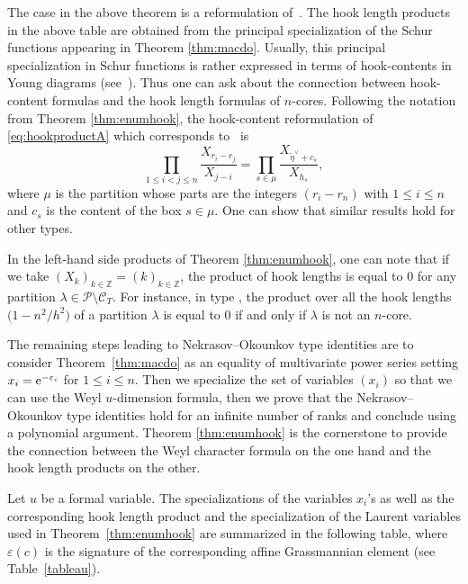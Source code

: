 \documentclass[pdftex]{sigma}
\numberwithin{equation}{section}
\newcommand{\cC}{\mathcal{C}}
\def\ccp{\mathcal P}
\newcommand{\Z}{\mathbb{Z}}
\begin{document}
\begin{Remark}
The case  in the above theorem is a reformulation of~\cite[Theorem 1]{HD}. The hook length products in the above table are obtained from the principal specialization of the Schur functions appearing in Theorem \ref{thm:macdo}. Usually, this principal specialization in Schur functions is rather expressed in terms of hook-contents in Young diagrams (see~\cite[Theorem $15.3$]{Stanleyhook}). Thus one can ask about the connection between hook-content formulas and the hook length formulas of $n$-cores. Following the notation from Theorem \ref{thm:enumhook}, the hook-content reformulation of \eqref{eq:hookproductA} which corresponds to~\cite[Theorem $17$]{HD} is
\[
\prod_{1\leq i<j\leq n} \frac{X_{r_i-r_j}}{X_{j-i}}=\prod_{s\in\mu} \frac{X_{\tilde{\eta}^{\vee}+c_s}}{X_{h_s}},
\]
where $\mu$ is the partition whose parts are the integers $(r_i-r_n)$ with $1\leq i\leq n$ and $c_s$ is the content of the box $s\in\mu$.
One can show that similar results hold for other types.
\end{Remark}

\begin{Remark}
In the left-hand side products of Theorem \ref{thm:enumhook}, one can note that if we take $(X_k)_{k\in\Z}=(k)_{k\in\Z}$, the product of hook lengths is equal to $0$ for any partition $\lambda\in\ccp\setminus \cC_T$. For instance, in type , the product over all the hook lengths $\bigl(1-n^2/h^2\bigr)$ of a partition $\lambda$ is equal to $0$ if and only if $\lambda$ is not an $n$-core.
\end{Remark}

The remaining steps leading to Nekrasov--Okounkov type identities are to consider Theorem~\ref{thm:macdo} as an equality of multivariate power series setting $x_i={\rm e}^{-\varepsilon_i}$ for $1\leq i\leq n$. Then we specialize the set of variables $(x_i)$ so that we can use the Weyl $u$-dimension formula, then we prove that the Nekrasov--Okounkov type identities hold for an infinite number of ranks and conclude using a polynomial argument. Theorem \ref{thm:enumhook} is the cornerstone to provide the connection between the Weyl character formula on the one hand and the hook length products on the other.

Let $u$ be a formal variable. The specializations of the variables $x_i$'s as well as the corresponding hook length product and the specialization of the Laurent variables used in Theorem~\ref{thm:enumhook} are summarized in the following table, where $\varepsilon(c)$ is the signature of the corresponding affine Grassmannian element (see Table~\ref{tableau}).
\end{document}
